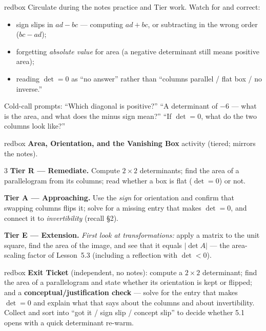 \documentclass[10pt]{article}
\begin{document}
\begin{skillbox}{redbox}
Circulate during the notes practice and Tier work. Watch for and correct:
\begin{itemize}[leftmargin=1.2em, nosep]
  \item sign slips in $ad-bc$ --- computing $ad+bc$, or subtracting in the wrong order ($bc-ad$);
  \item forgetting \emph{absolute value} for area (a negative determinant still means positive area);
  \item reading $\det=0$ as ``no answer'' rather than ``columns parallel / flat box / no inverse.''
\end{itemize}
Cold-call prompts: ``Which diagonal is positive?'' ``A determinant of $-6$ --- what is the area, and
what does the minus sign mean?'' ``If $\det=0$, what do the two columns look like?''
\end{skillbox}

\begin{skillbox}{redbox}
\textbf{Area, Orientation, and the Vanishing Box} activity (tiered; mirrors the notes).
\begin{multicols}{3}
\textbf{Tier R --- Remediate.} Compute $2\times2$ determinants; find the area of a parallelogram from
its columns; read whether a box is flat ($\det=0$) or not.

\columnbreak
\textbf{Tier A --- Approaching.} Use the \emph{sign} for orientation and confirm that swapping
columns flips it; solve for a missing entry that makes $\det=0$, and connect it to
\emph{invertibility} (recall §2).

\columnbreak
\textbf{Tier E --- Extension.} \emph{First look at transformations:} apply a matrix to the unit
square, find the area of the image, and see that it equals $|\det A|$ --- the area-scaling factor of
Lesson~5.3 (including a reflection with $\det<0$).
\end{multicols}
\end{skillbox}

\begin{skillbox}{redbox}
\textbf{Exit Ticket} (independent, no notes): compute a $2\times2$ determinant; find the area of a
parallelogram and state whether its orientation is kept or flipped; and a
\textbf{conceptual/justification check} --- solve for the entry that makes $\det=0$ and explain what
that says about the columns and about invertibility. Collect and sort into ``got it / sign slip /
concept slip'' to decide whether 5.1 opens with a quick determinant re-warm.
\end{skillbox}
\end{document}

